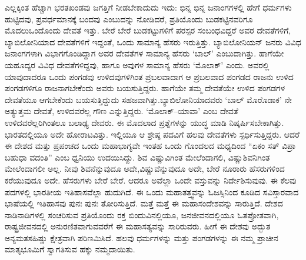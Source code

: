 ಎಲ್ಲಕ್ಕಿಂತ ಹೆಚ್ಚಾಗಿ ಭರತಖಂಡವು ಜಗತ್ತಿಗೆ ನೀಡಬೇಕಾದುದು ಇದು: ಭಿನ್ನ ಭಿನ್ನ ಜನಾಂಗಗಳಲ್ಲಿ ಹೇಗೆ ಧರ್ಮಗಳು ಹುಟ್ಟಿದವು, ಪ್ರವರ್ಧ\-ಮಾನಕ್ಕೆ ಬಂದವು ಎಂಬುದನ್ನು ನೋಡಿದರೆ, ಪ್ರತಿಯೊಂದು ಬುಡಕಟ್ಟಿನವರಿಗೂ ಮೊದಲು\break ಒಂದೊಂದು ದೇವತೆ ಇತ್ತು. ಬೇರೆ ಬೇರೆ ಬುಡಕಟ್ಟುಗಳಿಗೆ ಪರಸ್ಪರ ಸಂಬಂಧವಿದ್ದರೆ ಅವರ ದೇವತೆಗಳಿಗೆ, ಬ್ಯಾಬಿಲೋನಿಯಾದ ದೇವತೆಗಳಿಗೆ ಇದ್ದಂತೆ, ಒಂದು ಸಾಮಾನ್ಯ ಹೆಸರು ಇರುತ್ತಿತ್ತು. ಬ್ಯಾಬಿಲೋನಿಯನ್​ ಜನರು ವಿವಿಧ ಜನಾಂಗಗಳಾಗಿ ವಿಭಾಗಗೊಂಡಿದ್ದಾಗ ಅವರ ದೇವತೆಗಳ ಸಾಮಾನ್ಯ ಹೆಸರು ‘ಬಾಲ್​’ ಎಂಬುದಾಗಿತ್ತು. ಹಾಗೆಯೇ ಯಹೂದ್ಯರ ವಿವಿಧ ದೇವತೆಗಳಿದ್ದವು, ಹಾಗೂ ಅವುಗಳ ಸಾಮಾನ್ಯ ಹೆಸರು ‘ಮೊಲಾಕ್​’ ಎಂದು. ಅವರಲ್ಲಿ ಯಾವುದಾದರೂ ಒಂದು ಪಂಗಡವು ಉಳಿದವುಗಳಿಗಿಂತ ಪ್ರಬಲವಾದಾಗ ಆ ಪ್ರಬಲವಾದ ಪಂಗಡದ ರಾಜನು ಉಳಿದ ಪಂಗಡಗಳಿಗೂ ರಾಜನಾಗಬೇಕೆಂದು ಅವರು ಬಯಸುತ್ತಿದ್ದರು. ಹಾಗೆಯೇ ತಮ್ಮ ದೇವತೆಯೇ ಉಳಿದ ಪಂಗಡಗಳ ದೇವತೆಯೂ ಆಗಬೇಕೆಂದು ಬಯಸುತ್ತಿದ್ದುದು ಸಹಜವಾಗಿತ್ತು.\break ಬ್ಯಾಬಿಲೋನಿಯಾದವರು ‘ಬಾಲ್​ ಮೊರೊಡಾಕ’ ನೇ ಅತ್ಯುತ್ತಮ ದೇವತೆ, ಉಳಿದವರೆಲ್ಲ ಗೌಣ ಎನ್ನುತ್ತಿದ್ದರು. ‘ಮೊಲಾಕ್​–ಯಾವಾ’ ಎಂಬ ದೇವತೆ ಉಳಿದವರೆಲ್ಲರಿಗಿಂತಲೂ ಬಲಾಢ್ಯ ದೇವರು. ಈ ಮೊದಲಾದ ಪ್ರಶ್ನೆಗಳನ್ನು ಯುದ್ಧ ಮಾಡಿ ನಿಷ್ಕರ್ಷಿಸಬೇಕಾಗಿತ್ತು. ಭಾರತದಲ್ಲಿಯೂ ಅದೇ ಹೋರಾಟವಿತ್ತು. ಇಲ್ಲಿಯೂ ಆ ಶ್ರೇಷ್ಠ ಪದವಿಗೆ ಹಲವು ದೇವತೆಗಳು ಸ್ಪರ್ಧಿಸುತ್ತಿದ್ದರು. ಆದರೆ ಈ ದೇಶದ ಮತ್ತು ಪ್ರಪಂಚದ ಒಂದು ಮಹಾಭಾಗ್ಯವೇ ಇಂತಹ ಒಂದು ಗೊಂದಲದ ಮಧ್ಯದಿಂದ “ಏಕಂ ಸತ್​ ವಿಪ್ರಾ ಬಹುಧಾ ವದಂತಿ” ಎಂಬ ಧ್ವನಿಯು ಉದಯಿಸಿದ್ದು. ಶಿವ ವಿಷ್ಣುವಿಗಿಂತ ಮೇಲೆಂದಾಗಲಿ, ವಿಷ್ಣು\break ಶಿವನಿಗಿಂತ ಮೇಲೆಂದಾಗಲೀ ಅಲ್ಲ. ನೀವು ಶಿವನೆನ್ನುವುದೂ ಅದೇ,\break ವಿಷ್ಣುವೆನ್ನುವುದೂ ಅದೇ, ಬೇರೆ ನೂರಾರು ಹೆಸರುಗಳಿಂದ ಕರೆಯುವುದೂ ಅದೇ. ಹೆಸರುಗಳು ಬೇರೆ ಬೇರೆ. ಆದರೂ ಅವೆಲ್ಲಾ ಒಂದೇ ವಸ್ತುವನ್ನು ನಿರ್ದೇಶಿಸುವುವು. ಈ ಕೆಲವು ಪದಗಳಲ್ಲಿ ಭಾರತೀಯ ಇತಿಹಾಸವೆಲ್ಲಾ ಹುದುಗಿದೆ. ಈ ಒಂದು ಮಹಾತತ್ತ್ವವನ್ನು ಓಜಸ್ಸಿನಿಂದ ಕೂಡಿದ ಸವಿಸ್ತಾರವಾದ ಭಾಷೆಯಲ್ಲಿ ಇತಿಹಾಸವು ಪುನಃ ಪುನಃ ತೋರಿಸುತ್ತಿದೆ. ಮತ್ತೆ ಮತ್ತೆ ಈ ಮಹಾಸಂದೇಶವನ್ನು ಸಾರುತ್ತಿದೆ. ದೇಶದ ನಾಡಿನಾಡಿಗಳಲ್ಲಿ ಸಂಚರಿಸುವ ಪ್ರತಿಯೊಂದು ರಕ್ತ ಬಿಂದುವಿನಲ್ಲಿಯೂ, ಜನಜೀವನದಲ್ಲಿಯೂ ಓತಪ್ರೋತವಾಗಿ, ರಾಷ್ಟ್ರಜೀವನದಲ್ಲಿ ಅನುರಣಿತವಾಗುವವರೆಗೆ ಈ ಮಹಾಸತ್ಯವನ್ನು ಸಾರಿರುವರು. ಹೀಗೆ ಈ ದೇಶವು ಅದ್ಭುತ ಅನ್ಯಮತಸಹಿಷ್ಣು ಕ್ಷೇತ್ರವಾಗಿ ಪರಿಣಮಿಸಿದೆ. ಹಲವು ಧರ್ಮಗಳನ್ನು ಮತ್ತು ಪಂಗಡಗಳನ್ನು ಈ ನಮ್ಮ ಪ್ರಾಚೀನ ಮಾತೃಭೂಮಿಗೆ ಸ್ವಾಗತಿಸುವ ಹಕ್ಕು ನಮ್ಮದಾಯಿತು.

